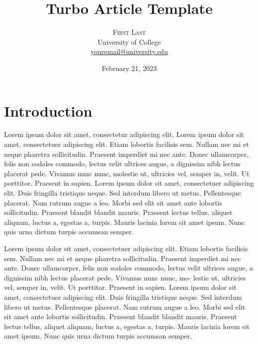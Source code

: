 \documentclass[
  9pt,
  twocolumn,
  twoside]{turbo}%
\title{Turbo Article Template}
\author{
\textsc{First Last}
\\[1ex]
\normalsize University of College
\\
\normalsize\href{mailto:youremail@university.edu}{youremail@university.edu}
}
\date{February 21, 2023}
\begin{document}
\renewcommand{\maketitlehookd}{%
\begin{abstract}
\noindent{}Lorem ipsum dolor sit amet, consectetuer adipiscing elit.
Etiam lobortis facilisis sem. Nullam nec mi et neque pharetra
sollicitudin. Praesent imperdiet mi nec ante. Donec ullamcorper, felis
non sodales com- modo, lectus velit ultrices augue, a dignissim nibh
lectus placerat pede. Vivamus nunc nunc, molestie ut, ultricies vel,
semper in, velit. Ut porttitor. Praesent in sapien. Lorem ipsum dolor
sit amet, consectetuer adipiscing elit. This is the abstract.
\end{abstract}
}

\maketitle

\ifdefined\Shaded\renewenvironment{Shaded}{\begin{tcolorbox}[borderline west={3pt}{0pt}{shadecolor}, frame hidden, boxrule=0pt, breakable, interior hidden, enhanced, sharp corners]}{\end{tcolorbox}}\fi




\hypertarget{sec-intro}{%
\section{Introduction}\label{sec-intro}}

Lorem ipsum dolor sit amet, consectetur adipiscing elit. Lorem ipsum
dolor sit amet, consectetuer adipiscing elit. Etiam lobortis facilisis
sem. Nullam nec mi et neque pharetra sollicitudin. Praesent imperdiet mi
nec ante. Donec ullamcorper, felis non sodales commodo, lectus velit
ultrices augue, a dignissim nibh lectus placerat pede. Vivamus nunc
nunc, molestie ut, ultricies vel, semper in, velit. Ut porttitor.
Praesent in sapien. Lorem ipsum dolor sit amet, consectetuer adipiscing
elit. Duis fringilla tristique neque. Sed interdum libero ut metus.
Pellentesque placerat. Nam rutrum augue a leo. Morbi sed elit sit amet
ante lobortis sollicitudin. Praesent blandit blandit mauris. Praesent
lectus tellus, aliquet aliquam, luctus a, egestas a, turpis. Mauris
lacinia lorem sit amet ipsum. Nunc quis urna dictum turpis accumsan
semper.

Lorem ipsum dolor sit amet, consectetuer adipiscing elit. Etiam lobortis
facilisis sem. Nullam nec mi et neque pharetra sollicitudin. Praesent
imperdiet mi nec ante. Donec ullamcorper, felis non sodales commodo,
lectus velit ultrices augue, a dignissim nibh lectus placerat pede.
Vivamus nunc nunc, mo- lestie ut, ultricies vel, semper in, velit. Ut
porttitor. Praesent in sapien. Lorem ipsum dolor sit amet, consectetuer
adipiscing elit. Duis fringilla tristique neque. Sed interdum libero ut
metus. Pellentesque placerat. Nam rutrum augue a leo. Morbi sed elit sit
amet ante lobortis sollicitudin. Praesent blandit blandit mauris.
Praesent lectus tellus, aliquet aliquam, luctus a, egestas a, turpis.
Mauris lacinia lorem sit amet ipsum. Nunc quis urna dictum turpis
accumsan semper.
\end{document}
